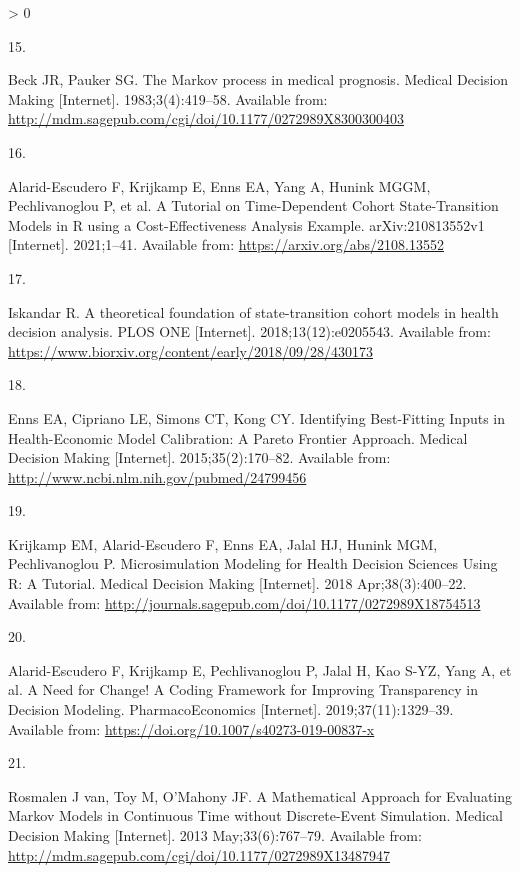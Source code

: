 \documentclass[
]{article}
\newlength{\cslhangindent}
\newlength{\csllabelwidth}
\newenvironment{CSLReferences}[2] %
 {%
  \setlength{\parindent}{0pt}
  \ifodd #1 \everypar{\setlength{\hangindent}{\cslhangindent}}\ignorespaces\fi
  \ifnum #2 > 0
  \setlength{\parskip}{#2\baselineskip}
  \fi
 }%
 {}
\newcommand{\CSLLeftMargin}[1]{\parbox[t]{\csllabelwidth}{#1}}
\newcommand{\CSLRightInline}[1]{\parbox[t]{\linewidth - \csllabelwidth}{#1}\break}
\begin{document}
\begin{CSLReferences}{0}{0}
\leavevmode\hypertarget{ref-Beck1983}{}%
\CSLLeftMargin{15. }
\CSLRightInline{Beck JR, Pauker SG. {The Markov process in medical prognosis}. Medical Decision Making {[}Internet{]}. 1983;3(4):419--58. Available from: \url{http://mdm.sagepub.com/cgi/doi/10.1177/0272989X8300300403}}

\leavevmode\hypertarget{ref-Alarid-Escudero2021b}{}%
\CSLLeftMargin{16. }
\CSLRightInline{Alarid-Escudero F, Krijkamp E, Enns EA, Yang A, Hunink MGGM, Pechlivanoglou P, et al. {A Tutorial on Time-Dependent Cohort State-Transition Models in R using a Cost-Effectiveness Analysis Example}. arXiv:210813552v1 {[}Internet{]}. 2021;1--41. Available from: \url{https://arxiv.org/abs/2108.13552}}

\leavevmode\hypertarget{ref-Iskandar2018a}{}%
\CSLLeftMargin{17. }
\CSLRightInline{Iskandar R. {A theoretical foundation of state-transition cohort models in health decision analysis}. PLOS ONE {[}Internet{]}. 2018;13(12):e0205543. Available from: \url{https://www.biorxiv.org/content/early/2018/09/28/430173}}

\leavevmode\hypertarget{ref-Enns2015e}{}%
\CSLLeftMargin{18. }
\CSLRightInline{Enns EA, Cipriano LE, Simons CT, Kong CY. {Identifying Best-Fitting Inputs in Health-Economic Model Calibration: A Pareto Frontier Approach}. Medical Decision Making {[}Internet{]}. 2015;35(2):170--82. Available from: \url{http://www.ncbi.nlm.nih.gov/pubmed/24799456}}

\leavevmode\hypertarget{ref-Krijkamp2018}{}%
\CSLLeftMargin{19. }
\CSLRightInline{Krijkamp EM, Alarid-Escudero F, Enns EA, Jalal HJ, Hunink MGM, Pechlivanoglou P. {Microsimulation Modeling for Health Decision Sciences Using R: A Tutorial}. Medical Decision Making {[}Internet{]}. 2018 Apr;38(3):400--22. Available from: \url{http://journals.sagepub.com/doi/10.1177/0272989X18754513}}

\leavevmode\hypertarget{ref-Alarid-Escudero2019e}{}%
\CSLLeftMargin{20. }
\CSLRightInline{Alarid-Escudero F, Krijkamp E, Pechlivanoglou P, Jalal H, Kao S-YZ, Yang A, et al. {A Need for Change! A Coding Framework for Improving Transparency in Decision Modeling}. PharmacoEconomics {[}Internet{]}. 2019;37(11):1329--39. Available from: \url{https://doi.org/10.1007/s40273-019-00837-x}}

\leavevmode\hypertarget{ref-VanRosmalen2013}{}%
\CSLLeftMargin{21. }
\CSLRightInline{Rosmalen J van, Toy M, O'Mahony JF. {A Mathematical Approach for Evaluating Markov Models in Continuous Time without Discrete-Event Simulation}. Medical Decision Making {[}Internet{]}. 2013 May;33(6):767--79. Available from: \url{http://mdm.sagepub.com/cgi/doi/10.1177/0272989X13487947}}


\end{CSLReferences}
\end{document}
